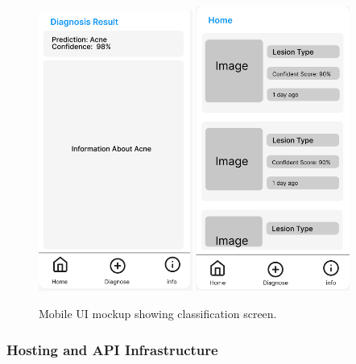 \documentclass[
  12pt,
  oneside]{article}
\begin{document}
\newpage

\begin{figure}[h!]
    \centering
    \includegraphics[width=0.45\textwidth]{mobile_classification.png}
    \hfill
    \includegraphics[width=0.45\textwidth]{mobile_class2.png}
    \caption{Mobile UI mockup showing classification screen.}
\end{figure}

\subsubsection{Hosting and API
Infrastructure}\label{hosting-and-api-infrastructure}
\end{document}

